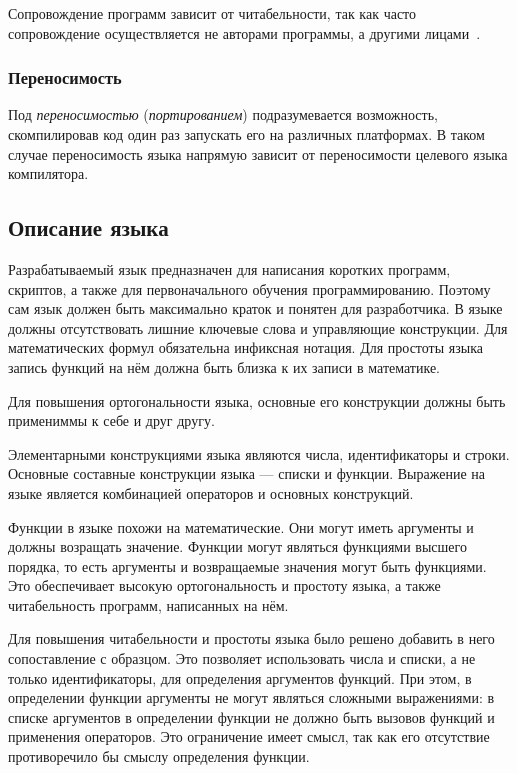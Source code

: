             Сопровождение программ зависит от читабельности, так как часто сопровождение осуществляется не авторами программы, а другими лицами~\cite{langs}.
        \subsubsection{Переносимость}
            Под \textit{переносимостью} (\textit{портированием}) подразумевается возможность, скомпилировав код один раз запускать его на различных платформах.
            В таком случае переносимость языка напрямую зависит от переносимости целевого языка компилятора.
    \subsection{Описание языка}
        Разрабатываемый язык предназначен для написания коротких программ, скриптов, а также для первоначального обучения программированию.
        Поэтому сам язык должен быть максимально краток и понятен для разработчика.
        В языке должны отсутствовать лишние ключевые слова и управляющие конструкции.
        Для математических формул обязательна инфиксная нотация.
        Для простоты языка запись функций на нём должна быть близка к их записи в математике.

        Для повышения ортогональности языка, основные его конструкции должны быть примениммы к себе и друг другу.

        Элементарными конструкциями языка являются числа, идентификаторы и строки.
        Основные составные конструкции языка --- списки и функции.
        Выражение на языке является комбинацией операторов и основных конструкций.

        Функции в языке похожи на математические.
        Они могут иметь аргументы и должны возращать значение.
        Функции могут являться функциями высшего порядка, то есть аргументы и возвращаемые значения могут быть функциями.
        Это обеспечивает высокую ортогональность и простоту языка, а также читабельность программ, написанных на нём.

        Для повышения читабельности и простоты языка было решено добавить в него сопоставление с образцом.
        Это позволяет использовать числа и списки, а не только идентификаторы, для определения аргументов функций.
        При этом, в определении функции аргументы не могут являться сложными выражениями: в списке аргументов в определении функции не должно быть вызовов функций и применения операторов.
        Это ограничение имеет смысл, так как его отсутствие противоречило бы смыслу определения функции.


